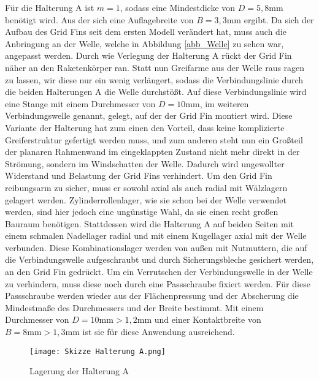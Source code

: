 Für die Halterung A ist $m=1$, sodass eine Mindestdicke von $D=5,8$mm benötigt wird. Aus der sich eine Auflagebreite von $B = 3,3$mm ergibt. Da sich der Aufbau des Grid Fins seit dem ersten Modell verändert hat, muss auch die Anbringung an der Welle, welche in Abbildung \ref{abb_Welle} zu sehen war, angepasst werden. Durch wie Verlegung der Halterung A rückt der Grid Fin näher an den Raketenkörper ran. Statt nun Greifarme aus der Welle raus ragen zu lassen, wir diese nur ein wenig verlängert, sodass die Verbindungslinie durch die beiden Halterungen A die Welle durchstößt. Auf diese Verbindungslinie wird eine Stange mit einem Durchmesser von $D = 10$mm, im weiteren Verbindungswelle genannt, gelegt, auf der der Grid Fin montiert wird. Diese Variante der Halterung hat zum einen den Vorteil, dass keine komplizierte Greiferstruktur gefertigt werden muss, und zum anderen steht nun ein Großteil der planaren Rahmenwand im eingeklappten Zustand nicht mehr direkt in der Strömung, sondern im Windschatten der Welle. Dadurch wird ungewollter Widerstand und Belastung der Grid Fins verhindert. Um den Grid Fin reibungsarm zu sicher, muss er sowohl axial als auch radial mit Wälzlagern gelagert werden. Zylinderrollenlager, wie sie schon bei der Welle verwendet werden, sind hier jedoch eine ungünstige Wahl, da sie einen recht großen Bauraum benötigen. Stattdessen wird die Halterung A auf beiden Seiten mit einem schmalen Nadellager radial und mit einem Kugellager axial mit der Welle verbunden. Diese Kombinationslager werden von außen mit Nutmuttern, die auf die Verbindungswelle aufgeschraubt und durch Sicherungsbleche gesichert werden, an den Grid Fin gedrückt. Um ein Verrutschen der Verbindungswelle in der Welle zu verhindern, muss diese noch durch eine Passschraube fixiert werden. Für diese Passschraube werden wieder aus der Flächenpressung und der Abscherung die Mindestmaße des Durchmessers und der Breite bestimmt. Mit einem Durchmesser von $D = 10\mathrm{mm}> 1,2$mm und einer Kontaktbreite von $B = 8\mathrm{mm}> 1,3$mm ist sie für diese Anwendung ausreichend.
\begin{figure}[h] 
	\centering
	\texttt{[image: Skizze Halterung A.png]}
	\caption{Lagerung der Halterung A}
\end{figure}\\
